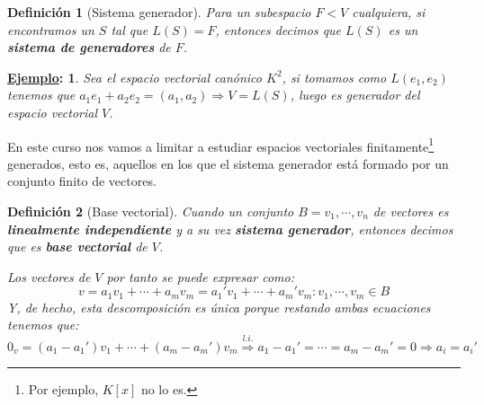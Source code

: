 \documentclass[10pt,a4paper,openright]{book}
\theoremstyle{break}
\newtheorem*{defi}{Definición}
\newtheorem*{ej}{\underline{Ejemplo}:}
\begin{document}
\begin{defi}[Sistema generador]
Para un subespacio $F<V$ cualquiera, si encontramos un $S$ tal que $L(S)=F$, entonces decimos que $L(S)$ es un \textbf{sistema de generadores} de $F$.
\end{defi}
\begin{ej}
Sea el espacio vectorial canónico $K^2$, si tomamos como $L(e_1,e_2)$ tenemos que $a_1e_1+a_2e_2=(a_1, a_2)\Rightarrow V=L(S)$, luego es generador del espacio vectorial $V$.
\end{ej}

En este curso nos vamos a limitar a estudiar espacios vectoriales finitamente\footnote{Por ejemplo, $K[x]$ no lo es.} generados, esto es, aquellos en los que el sistema generador está formado por un conjunto finito de vectores.

\begin{defi}[Base vectorial]
Cuando un conjunto $B={v_1, \cdots , v_n}$ de vectores es \textbf{linealmente independiente} y a su vez \textbf{sistema generador}, entonces decimos que es \textbf{base vectorial} de $V$.

Los vectores de $V$ por tanto se puede expresar como:
$$v=a_1v_1+\cdots+a_mv_m=a_1'v_1+\cdots+a_m'v_m: v_1, \cdots, v_m\in B$$
Y, de hecho, esta descomposición es única porque restando ambas ecuaciones tenemos que:
$$0_v=(a_1-a_1')v_1+\cdots+(a_m-a_m')v_m\stackrel{l.i.}{\Rightarrow} a_1-a_1'=\cdots=a_m-a_m'=0\Rightarrow a_i=a_i'$$
\end{defi}
\end{document}

